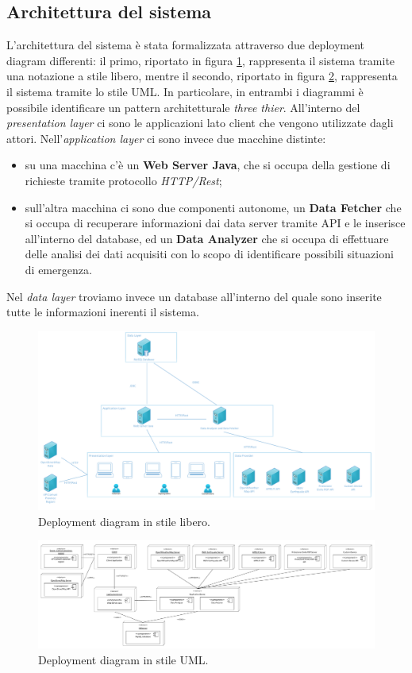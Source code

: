 \clearpage
\subsection{Architettura del sistema}
L'architettura del sistema è stata formalizzata attraverso due deployment diagram differenti: il primo, riportato in figura \ref{fig:DeplymnetDiagramNonFormale}, rappresenta il sistema tramite una notazione a stile libero, mentre il secondo, riportato in figura \ref{fig:DeplymnetDiagramFormale}, rappresenta il sistema tramite lo stile UML. In particolare, in entrambi i diagrammi è possibile identificare un pattern architetturale \textit{three thier}. All'interno del \textit{presentation layer} ci sono le applicazioni lato client che vengono utilizzate dagli attori. Nell'\textit{application layer} ci sono invece due macchine distinte:

\begin{itemize}
	\item su una macchina c'è un \textbf{Web Server Java}, che si occupa della gestione di richieste tramite protocollo \textit{HTTP/Rest};
	\item sull'altra macchina ci sono due componenti autonome, un \textbf{Data Fetcher} che si occupa di recuperare informazioni dai data server tramite API e le inserisce all'interno del database, ed un \textbf{Data Analyzer} che si occupa di effettuare delle analisi dei dati acquisiti con lo scopo di identificare possibili situazioni di emergenza.
\end{itemize}

Nel \textit{data layer} troviamo invece un database all'interno del quale sono inserite tutte le informazioni inerenti il sistema.

\begin{figure}
	\centering
	\includegraphics[width=0.9\linewidth]{OtherFiles/DeploymentDiagramNonFormale}
	\caption{Deployment diagram in stile libero.}
	\label{fig:DeplymnetDiagramNonFormale}
\end{figure}

\begin{figure}
	\centering
	\includegraphics[width=0.9\linewidth]{OtherFiles/DeplymentDiagramFormale}
	\caption{Deployment diagram in stile UML.}
	\label{fig:DeplymnetDiagramFormale}
\end{figure}
